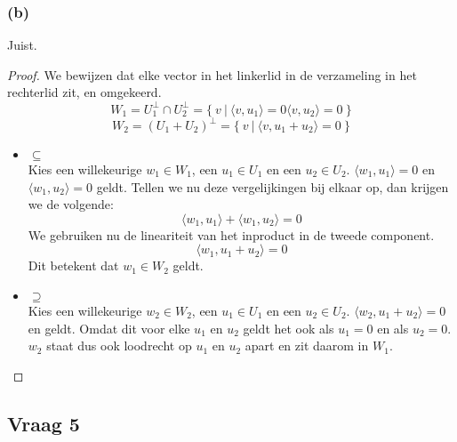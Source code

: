 \documentclass[lineaire_algebra_oplossingen.tex]{subfiles}
\begin{document}
\subsubsection*{(b)}
Juist.
\begin{proof}
We bewijzen dat elke vector in het linkerlid in de verzameling in het rechterlid zit, en omgekeerd.
\[
W_1 = U_1^\bot \cap U_2^\bot = \{\ v\ |\ \langle v,u_1\rangle = 0 \langle v,u_2\rangle = 0\ \}
\]
\[
W_2 = (U_1+U_2)^\bot = \{\ v\ |\ \langle v, u_1+u_2\rangle = 0\ \}
\]
\begin{itemize}
\item $\subseteq$\\
Kies een willekeurige $w_1 \in W_1$, een $u_1 \in U_1$ en een $u_2 \in U_2$. $\langle w_1,u_1\rangle = 0$ en $\langle w_1,u_2\rangle = 0$ geldt. Tellen we nu deze vergelijkingen bij elkaar op, dan krijgen we de volgende:
\[
\langle w_1,u_1\rangle + \langle w_1,u_2\rangle = 0
\]
We gebruiken nu de lineariteit van het inproduct in de tweede component.
\[
\langle w_1,u_1+u_2\rangle = 0
\]
Dit betekent dat $w_1 \in W_2$ geldt.

\item $\supseteq$\\
Kies een willekeurige $w_2 \in W_2$, een $u_1 \in U_1$ en een $u_2 \in U_2$. $\langle w_2,u_1+u_2\rangle = 0$ en geldt.
Omdat dit voor elke $u_1$ en $u_2$ geldt het ook als $u_1=0$ en als $u_2=0$. $w_2$ staat dus ook loodrecht op $u_1$ en $u_2$ apart en zit daarom in $W_1$.
\end{itemize}
\end{proof}

\subsection{Vraag 5}
\end{document}
